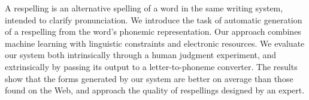 A respelling is an alternative spelling of a word in the same writing system, intended to clarify pronunciation. We introduce the task of
 automatic generation of a respelling from the word's phonemic
 representation. Our approach combines machine learning with linguistic
 constraints and electronic resources. We evaluate our system both
 intrinsically through a human judgment experiment, and extrinsically
 by passing its output to a letter-to-phoneme converter. The results
 show that the forms generated by our system are better on average than
 those found on the Web, and approach the quality of respellings
 designed by an expert.

